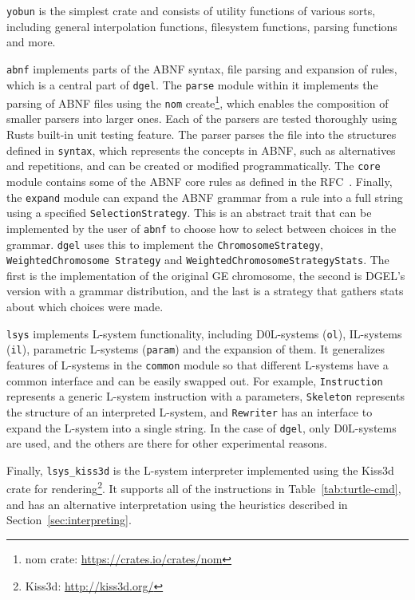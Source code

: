 \texttt{yobun} is the simplest crate and consists of utility functions of various sorts, including general interpolation functions, filesystem functions, parsing functions and more.

\texttt{abnf} implements parts of the ABNF syntax, file parsing and expansion of rules, which is a central part of \texttt{dgel}.
The \texttt{parse} module within it implements the parsing of ABNF files using the \texttt{nom} create\footnote{nom crate: \url{https://crates.io/crates/nom}}, which enables the composition of smaller parsers into larger ones.
Each of the parsers are tested thoroughly using Rusts built-in unit testing feature.
The parser parses the file into the structures defined in \texttt{syntax}, which represents the concepts in ABNF, such as alternatives and repetitions, and can be created or modified programmatically.
The \texttt{core} module contains some of the ABNF core rules as defined in the RFC~\cite{RFC5234}.
Finally, the \texttt{expand} module can expand the ABNF grammar from a rule into a full string using a specified \texttt{SelectionStrategy}.
This is an abstract trait that can be implemented by the user of \texttt{abnf} to choose how to select between choices in the grammar.
\texttt{dgel} uses this to implement the \texttt{ChromosomeStrategy}, \texttt{WeightedChromosome Strategy} and \texttt{WeightedChromosomeStrategyStats}.
The first is the implementation of the original GE chromosome, the second is DGEL's version with a grammar distribution, and the last is a strategy that gathers stats about which choices were made.

\texttt{lsys} implements L-system functionality, including D0L-systems (\texttt{ol}), IL-systems (\texttt{il}), parametric L-systems (\texttt{param}) and the expansion of them.
It generalizes features of L-systems in the \texttt{common} module so that different L-systems have a common interface and can be easily swapped out.
For example, \texttt{Instruction} represents a generic L-system instruction with a parameters, \texttt{Skeleton} represents the structure of an interpreted L-system, and \texttt{Rewriter} has an interface to expand the L-system into a single string.
In the case of \texttt{dgel}, only D0L-systems are used, and the others are there for other experimental reasons.

Finally, \texttt{lsys\_kiss3d} is the L-system interpreter implemented using the Kiss3d crate for rendering\footnote{Kiss3d: \url{http://kiss3d.org/}}.
It supports all of the instructions in Table~\ref{tab:turtle-cmd}, and has an alternative interpretation using the heuristics described in Section~\ref{sec:interpreting}.

